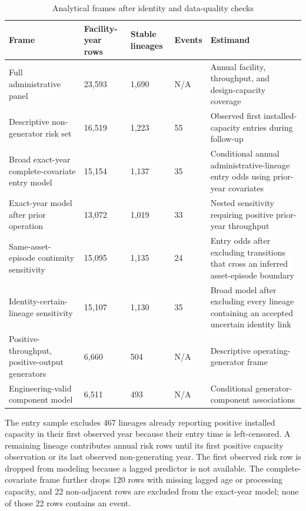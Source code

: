 \documentclass[11pt,letterpaper]{article}
\begin{document}
\begin{table}[!htbp]
\centering
\caption{Analytical frames after identity and data-quality checks}
\label{tab:frames}
\scriptsize
\setlength{\tabcolsep}{3.2pt}
\renewcommand{\arraystretch}{1.14}
\begin{tabularx}{\textwidth}{L{2.45cm}R{1.25cm}R{1.15cm}R{1.05cm}Y}
\toprule
Frame & Facility-year rows & Stable lineages & Events & Estimand \\
\midrule
Full administrative panel & 23,593 & 1,690 & N/A & Annual facility,
throughput, and design-capacity coverage \\
Descriptive non-generator risk set & 16,519 & 1,223 & 55 & Observed first
installed-capacity entries during follow-up \\
Broad exact-year complete-covariate entry model & 15,154 & 1,137 & 35 &
Conditional annual administrative-lineage entry odds using prior-year covariates \\
Exact-year model after prior operation & 13,072 & 1,019 & 33 & Nested
sensitivity requiring positive prior-year throughput \\
Same-asset-episode continuity sensitivity & 15,095 & 1,135 & 24 & Entry odds
after excluding transitions that cross an inferred asset-episode boundary \\
Identity-certain-lineage sensitivity & 15,107 & 1,130 & 35 & Broad model after
excluding every lineage containing an accepted uncertain identity link \\
Positive-throughput, positive-output generators & 6,660 & 504 & N/A &
Descriptive operating-generator frame \\
Engineering-valid component model & 6,511 & 493 & N/A & Conditional
generator-component associations \\
\bottomrule
\end{tabularx}
\renewcommand{\arraystretch}{1}
\normalsize
\end{table}

The entry sample excludes 467 lineages already reporting positive installed
capacity in their first observed year because their entry time is left-censored.
A remaining lineage contributes annual risk rows until its first positive
capacity observation or its last observed non-generating year. The first
observed risk row is dropped from modeling because a lagged predictor is not
available. The complete-covariate frame further drops 120 rows with missing
lagged age or processing capacity, and 22 non-adjacent rows are excluded from
the exact-year model; none of those 22 rows contains an event.
\end{document}
